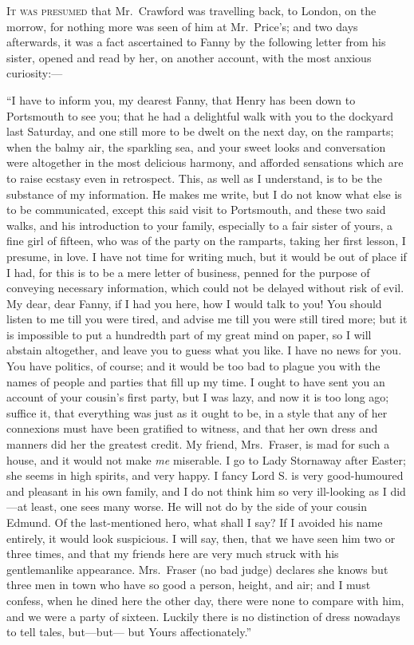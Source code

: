 \documentclass{article}
\newcommand{\gintro}[1]{\textcolor{gcolor}{\textsc{#1}}}
\begin{document}
\gintro{It was presumed} that Mr.\ Crawford was travelling back,
to London, on the morrow, for nothing more was seen
of him at Mr.\ Price's; and two days afterwards, it was
a fact ascertained to Fanny by the following letter from
his sister, opened and read by her, on another account,
with the most anxious curiosity:---%

``I have to inform you, my dearest Fanny, that Henry
has been down to Portsmouth to see you; that he had a
delightful walk with you to the dockyard last Saturday,
and one still more to be dwelt on the next day,
on the ramparts; when the balmy air, the sparkling sea,
and your sweet looks and conversation were altogether
in the most delicious harmony, and afforded sensations
which are to raise ecstasy even in retrospect.  This, as well
as I understand, is to be the substance of my information.
He makes me write, but I do not know what else is to
be communicated, except this said visit to Portsmouth,
and these two said walks, and his introduction to
your family, especially to a fair sister of yours, a fine
girl of fifteen, who was of the party on the ramparts,
taking her first lesson, I presume, in love.  I have
not time for writing much, but it would be out of place
if I had, for this is to be a mere letter of business,
penned for the purpose of conveying necessary information,
which could not be delayed without risk of evil.  My dear,
dear Fanny, if I had you here, how I would talk to you!
You should listen to me till you were tired, and advise
me till you were still tired more; but it is impossible
to put a hundredth part of my great mind on paper,
so I will abstain altogether, and leave you to guess what
you like.  I have no news for you.  You have politics,
of course; and it would be too bad to plague you with
the names of people and parties that fill up my time.
I ought to have sent you an account of your cousin's
first party, but I was lazy, and now it is too long ago;
suffice it, that everything was just as it ought to be,
in a style that any of her connexions must have been
gratified to witness, and that her own dress and manners did
her the greatest credit.  My friend, Mrs.\ Fraser, is mad
for such a house, and it would not make \emph{me} miserable.
I go to Lady Stornaway after Easter; she seems in high spirits,
and very happy.  I fancy Lord S. is very good-humoured
and pleasant in his own family, and I do not think him so
very ill-looking as I did---at least, one sees many worse.
He will not do by the side of your cousin Edmund.
Of the last-mentioned hero, what shall I say?  If I
avoided his name entirely, it would look suspicious.
I will say, then, that we have seen him two or three times,
and that my friends here are very much struck with his
gentlemanlike appearance.  Mrs.\ Fraser (no bad judge)
declares she knows but three men in town who have so good
a person, height, and air; and I must confess, when he dined
here the other day, there were none to compare with him,
and we were a party of sixteen.  Luckily there is no
distinction of dress nowadays to tell tales, but---but---%
but Yours affectionately.''
\end{document}
